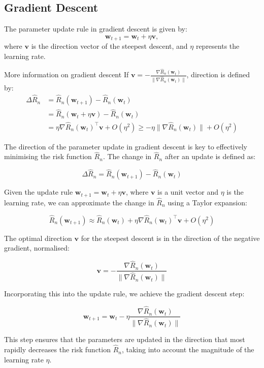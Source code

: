 \subsection{Gradient Descent}
The parameter update rule in gradient descent is given by:
\[ \mathbf{w}_{t+1} = \mathbf{w}_t + \eta\mathbf{v}, \]
where \( \mathbf{v} \) is the direction vector of the steepest descent, and \( \eta \) represents the learning rate.

\begin{sidenotebox}{More information on gradient descent}
If $\mathbf{v}=-\frac{\nabla\hat{R}_{n}(\mathbf{w}_{t})}{\|\nabla\hat{R}_{n}(\mathbf{w}_{t})\|}$, direction is defined by:
\begin{align*}\Delta\hat{R}_{n}&=\hat{R}_{n}(\mathbf{w}_{t+1})-\hat{R}_{n}(\mathbf{w}_{t})\\
&=\hat{R}_{n}(\mathbf{w}_{t}+\eta\mathbf{v})-\hat{R}_{n}(\mathbf{w}_{t})\\
&=\eta\nabla\hat{R}_{n}(\mathbf{w}_{t})^{\top}\mathbf{v}+O(\eta^{2})\geqslant-\eta\|\nabla\hat{R}_{n}(\mathbf{w}_{t})\|+O(\eta^{2})\end{align*}

The direction of the parameter update in gradient descent is key to effectively minimising the risk function \( \hat{R}_n \). The change in \( \hat{R}_n \) after an update is defined as:

\[ \Delta \hat{R}_n = \hat{R}_n(\mathbf{w}_{t+1}) - \hat{R}_n(\mathbf{w}_t) \]

Given the update rule \( \mathbf{w}_{t+1} = \mathbf{w}_t + \eta\mathbf{v} \), where \( \mathbf{v} \) is a unit vector and \( \eta \) is the learning rate, we can approximate the change in \( \hat{R}_n \) using a Taylor expansion:

\[ \hat{R}_n(\mathbf{w}_{t+1}) \approx \hat{R}_n(\mathbf{w}_t) + \eta \nabla \hat{R}_n(\mathbf{w}_t)^\top \mathbf{v} + O(\eta^2) \]

The optimal direction \( \mathbf{v} \) for the steepest descent is in the direction of the negative gradient, normalised:

\[ \mathbf{v} = -\frac{\nabla \hat{R}_n(\mathbf{w}_t)}{\| \nabla \hat{R}_n(\mathbf{w}_t) \|} \]

Incorporating this into the update rule, we achieve the gradient descent step:

\[ \mathbf{w}_{t+1} = \mathbf{w}_t - \eta \frac{\nabla \hat{R}_n(\mathbf{w}_t)}{\| \nabla \hat{R}_n(\mathbf{w}_t) \|} \]

This step ensures that the parameters are updated in the direction that most rapidly decreases the risk function \( \hat{R}_n \), taking into account the magnitude of the learning rate \( \eta \).
\end{sidenotebox}

